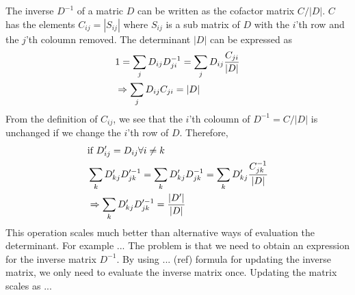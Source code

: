 \documentclass[a4paper,10pt,twocolumn]{article} %
\begin{document}
The inverse $D^{-1}$ of a matric $D$ can be written as the cofactor matrix $C/|D|$. $C$ has the elements $C_{ij}=|S_{ij}|$ where $S_{ij}$ is a sub matrix of $D$ with the $i$'th row and the 
$j$'th coloumn removed. The determinant $|D|$ can be expressed as 
\begin{align}
	&1=\sum_j D_{ij}D^{-1}_{ji}=\sum_jD_{ij}\frac{C_{ji}}{|D|}\notag\\
	&\Rightarrow \sum_jD_{ij}C_{ji}=|D|
\end{align}
From the definition of $C_{ij}$, we see that the $i$'th coloumn of $D^{-1}=C/|D|$ is unchanged if we change the $i$'th row of $D$.
Therefore,
\begin{align}
	&\text{if } D'_{ij}=D_{ij} \forall i\neq k\notag\\
	&\sum_k D'_{kj} D'^{-1}_{jk} = \sum_k D'_{kj} D^{-1}_{jk} = \sum_k D'_{kj} \frac{C^{-1}_{jk}}{|D|}\notag\\ 
	&\Rightarrow \sum_k D'_{kj} D'^{-1}_{jk} = \frac{|D'|}{|D|}\label{eqDet}
\end{align}
This operation scales much better than alternative ways of evaluation the determinant. For example ... 
The problem is that we need to obtain an expression for the inverse matrix $D^{-1}$. By using ... (ref) formula for updating the inverse
matrix, we only need to evaluate the inverse matrix once. Updating the matrix scales as ...
\end{document}
